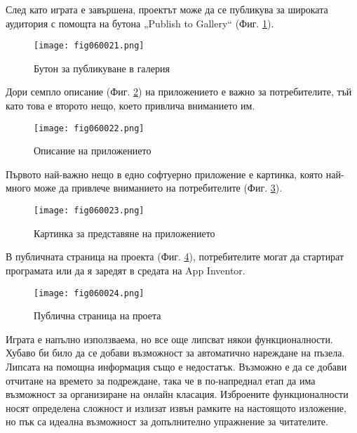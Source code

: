 След като играта е завършена, проектът може да се публикува за широката аудитория с помощта на бутона „Publish to Gallery“ (Фиг. \ref{fig060021}).

\begin{figure}[H]
  \centering
  \texttt{[image: fig060021.png]}
  \caption{Бутон за публикуване в галерия}
\label{fig060021}
\end{figure}

Дори семпло описание (Фиг. \ref{fig060022}) на приложението е важно за потребителите, тъй като това е второто нещо, което привлича вниманието им.

\begin{figure}[H]
  \centering
  \texttt{[image: fig060022.png]}
  \caption{Описание на приложението}
\label{fig060022}
\end{figure}

Първото най-важно нещо в едно софтуерно приложение е картинка, която най-много може да привлече вниманието на потребителите (Фиг. \ref{fig060023}).

\begin{figure}[H]
  \centering
  \texttt{[image: fig060023.png]}
  \caption{Картинка за представяне на приложението}
\label{fig060023}
\end{figure}

В публичната страница на проекта (Фиг. \ref{fig060024}), потребителите могат да стартират програмата или да я заредят в средата на App Inventor.

\begin{figure}[H]
  \centering
  \texttt{[image: fig060024.png]}
  \caption{Публична страница на проета}
\label{fig060024}
\end{figure}

Играта е напълно използваема, но все още липсват някои функционалности. Хубаво би било да се добави възможност за автоматично нареждане на пъзела. Липсата на помощна информация също е недостатък. Възможно е да се добави отчитане на времето за подреждане, така че в по-напреднал етап да има възможност за организиране на онлайн класация. Изброените функционалности носят определена сложност и излизат извън рамките на настоящото изложение, но пък са идеална възможност за допълнително упражнение за читателите. 

